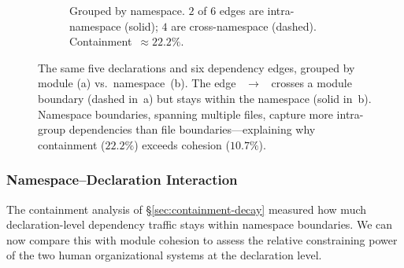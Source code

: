 \begin{figure}[ht]
\begin{subfigure}[b]{0.48\textwidth}
\caption{Grouped by \textcolor{green!50!black}{namespace}. $2$ of $6$ edges are intra-namespace (solid); $4$ are cross-namespace (dashed). Containment~$\approx 22.2\%$.}
\label{fig:ns-vs-mod-namespace}
\end{subfigure}
\caption{The same five declarations and six dependency edges, grouped by module (a) vs.\ namespace~(b). The edge ~$\to$~ crosses a \textcolor{blue!60!black}{module boundary} (dashed in~a) but stays within the \textcolor{green!50!black}{} namespace (solid in~b). Namespace boundaries, spanning multiple files, capture more intra-group dependencies than file boundaries---explaining why containment ($22.2\%$) exceeds cohesion ($10.7\%$).}
\label{fig:ns-vs-mod}
\end{figure}

\subsubsection{Namespace--Declaration Interaction}
\label{sec:ns-decl-main}

The containment analysis of \S\ref{sec:containment-decay} measured how much declaration-level dependency traffic stays within namespace boundaries. We can now compare this with module cohesion to assess the relative constraining power of the two human organizational systems at the declaration level.

